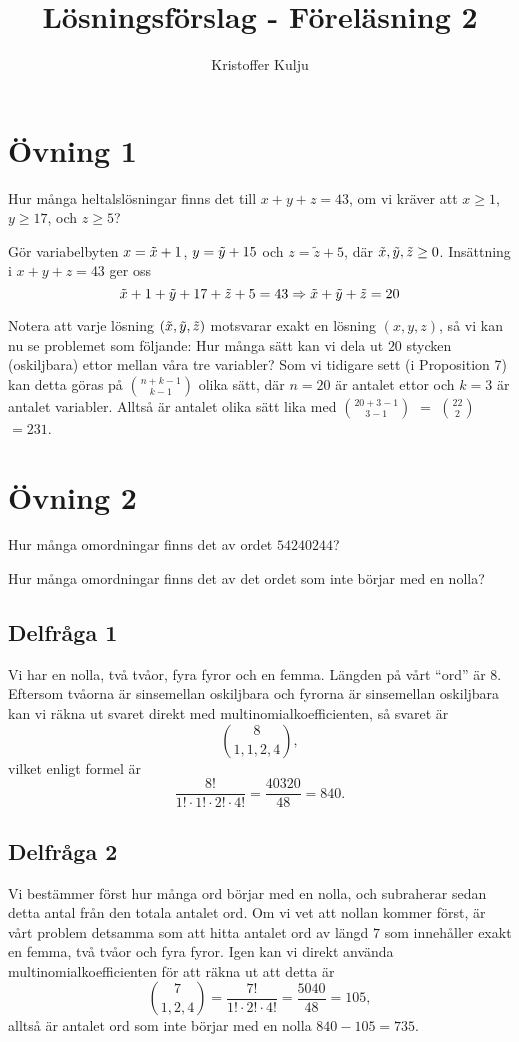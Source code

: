 \documentclass{article}
\title{Lösningsförslag - Föreläsning 2}
\author{Kristoffer Kulju}
\begin{document}
\maketitle

\section*{Övning 1}
\begin{xca}
  Hur många heltalslösningar finns det till $x + y + z = 43$, om vi kräver att $x \geq 1$, $y \geq 17$, och $z \geq 5$?
\end{xca}

Gör variabelbyten $x=\Tilde{x} + 1$, $y = \Tilde{y} + 15$ och $z=\tilde{z}+5$, där $\Tilde{x}, \Tilde{y}, \Tilde{z}\geq 0$. Insättning i $x+y+z=43$ ger oss $$
\Tilde{x} + 1 + \Tilde{y} + 17 + \Tilde{z} + 5 = 43 \Rightarrow  \Tilde{x} +  \Tilde{y} +  \Tilde{z}= 20
$$

Notera att varje lösning $(\Tilde{x}, \Tilde{y}, \Tilde{z})$ motsvarar exakt en lösning $(x, y, z)$, så vi kan nu se problemet som följande: Hur många sätt kan vi dela ut $20$ stycken (oskiljbara) ettor mellan våra tre variabler? Som vi tidigare sett (i Proposition 7) kan detta göras på $n + k - 1 \choose k - 1$ olika sätt, där $n=20$ är antalet ettor och $k=3$ är antalet variabler. Alltså är antalet olika sätt lika med $20 + 3 - 1 \choose 3 - 1$ $=$ $22 \choose 2$ $=231$. 

\section*{Övning 2}
\begin{xca}
  Hur många omordningar finns det av ordet $54240244$?

  Hur många omordningar finns det av det ordet som inte börjar med en nolla?
\end{xca}

\subsection*{Delfråga 1}
Vi har en nolla, två tvåor, fyra fyror och en femma. Längden på vårt ``ord'' är $8$. Eftersom tvåorna är sinsemellan oskiljbara och fyrorna är sinsemellan oskiljbara kan vi räkna ut svaret direkt med multinomialkoefficienten, så svaret är
$${8 \choose 1, 1, 2, 4},$$
vilket enligt formel är 
$$\frac{8!}{1!\cdot1!\cdot2!\cdot4!} = \frac{40320}{48}=840.$$

\subsection*{Delfråga 2}
Vi bestämmer först hur många ord börjar med en nolla, och subraherar sedan detta antal från den totala antalet ord. Om vi vet att nollan kommer först, är vårt problem detsamma som att hitta antalet ord av längd $7$ som innehåller exakt en femma, två tvåor och fyra fyror. Igen kan vi direkt använda multinomialkoefficienten för att räkna ut att detta är
$$\binom{7}{1, 2, 4} = \frac{7!}{1!\cdot 2!\cdot 4!}=\frac{5040}{48}=105,$$
alltså är antalet ord som inte börjar med en nolla $840-105=735$. 
\end{document}
